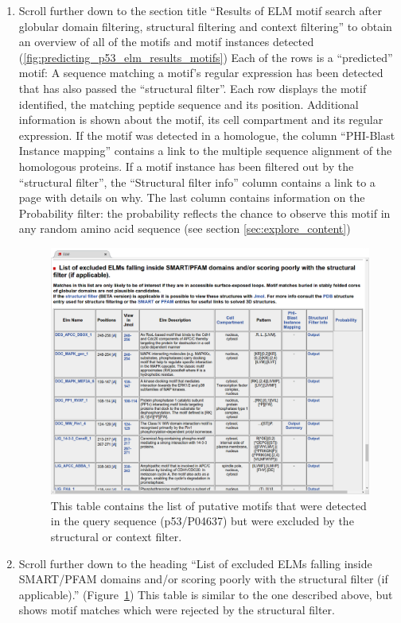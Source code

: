 \documentclass[12pt]{article}
\begin{document}
\begin{enumerate}
\item Scroll further down to the section title ``Results of ELM motif search
	after globular domain filtering, structural filtering and context
	filtering'' to obtain an overview of all of the motifs and motif
	instances detected
	(\ref{fig:predicting_p53_elm_results_motifs})
	Each of the rows is a ``predicted'' motif: A sequence matching a
	motif's regular expression has been detected that has also passed the
	``structural filter''.
	Each row displays the motif identified, the matching peptide
	sequence and its position. Additional information is shown about the
	motif, its cell compartment and its regular expression. If the motif
	was detected in a homologue, the column ``PHI-Blast Instance
	mapping'' contains a link to the multiple sequence alignment of the
	homologous proteins. If a motif instance has been filtered out
	by the ``structural filter'', the ``Structural filter info'' column
	contains a link to a page with details on why.
	The last column contains information on the Probability filter: the
	probability reflects the chance to observe this motif in any random
	amino acid sequence (see section \ref{sec:explore_content})

\begin{figure}[h!]
\centering
	\includegraphics[width=\textwidth]{Figures/predicting_p53/elm_results_motifs_filtered.png}
	\caption{
	This table contains the list of putative motifs that were detected in
	the query sequence (p53/P04637) but were excluded by the
	structural or context filter.
	}
	\label{fig:predicting_p53_elm_results_motifs_filtered}
\end{figure}

\item Scroll further down to the heading ``List of excluded ELMs falling inside
	SMART/PFAM domains and/or scoring poorly with the structural filter (if
	applicable).''
	(Figure~\ref{fig:predicting_p53_elm_results_motifs_filtered})
	This table is similar to the one described above, but shows motif
	matches which were rejected by the structural filter.
\end{enumerate}
\end{document}
